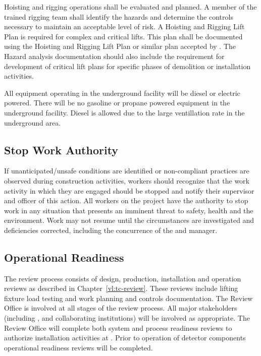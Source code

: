 Hoisting and rigging operations shall be evaluated and planned.  A
member of the trained rigging team shall identify the hazards and
determine the controls necessary to maintain an acceptable level of
risk.  A Hoisting and Rigging Lift Plan is required for complex and
critical lifts. This plan shall be documented using the \fnal Hoisting
and Rigging Lift Plan or similar plan accepted by \fnal. The Hazard
analysis documentation should also include the requirement for
development of critical lift plans for specific phases of demolition
or installation activities.

All equipment operating in the underground facility will be diesel or
electric powered. There will be no gasoline or propane powered
equipment in the underground facility. Diesel is allowed due to the large
ventillation rate in the underground area.

\subsection{Stop Work Authority}

If unanticipated/unsafe conditions are identified or non-compliant
practices are observed during construction activities, workers should
recognize that the work activity in which they are engaged should be
stopped and notify their supervisor and  officer of
this action. All workers on the  project have the
authority to stop work in any situation that presents an imminent
threat to safety, health and the environment. Work may not resume
until the circumstances are investigated and deficiencies corrected,
including the concurrence of the  
and   manager.

\subsection{Operational Readiness}

The  review process consists of design, production,
installation and operation reviews as described in
Chapter~\ref{vl:tc-review}. These reviews include lifting fixture
load testing and work planning and controls documentation. The
 Review Office is involved at all stages of the review
process. All major stakeholders (including \fnal,  and
 collaborating institutions) will be involved as
appropriate. The Review Office will complete both system and process
readiness reviews to authorize installation activities at
.  Prior to operation of detector components operational
readiness reviews will be completed.

